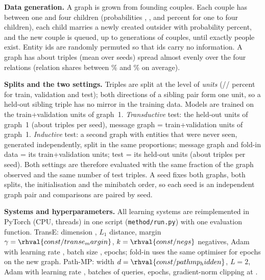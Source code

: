 \vspace{4pt}\noindent\textbf{Data generation.} A graph is grown from  founding couples. Each couple has between one and four children (probabilities , ,  and  percent for one to four children), each child marries a newly created outsider with probability  percent, and the new couple is queued, up to  generations of couples, until exactly  people exist. Entity ids are randomly permuted so that ids carry no information. A graph has about  triples (mean over seeds) spread almost evenly over the four relations (relation shares between \% and \% on average).

\vspace{4pt}\noindent\textbf{Splits and the two settings.} Triples are split at the level of \emph{units} (// percent for train, validation and test); both directions of a sibling pair form one unit, so a held-out sibling triple has no mirror in the training data. Models are trained on the train+validation units of graph~1. \emph{Transductive} test: the held-out units of graph~1 (about  triples per seed), message graph = train+validation units of graph~1. \emph{Inductive} test: a second graph with  entities that were never seen, generated independently, split in the same proportions; message graph and fold-in data = its train+validation units; test = its held-out units (about  triples per seed). Both settings are therefore evaluated with the same fraction of the graph observed and the same number of test triples. A seed fixes both graphs, both splits, the initialisation and the minibatch order, so each seed is an independent graph pair and comparisons are paired by seed.

\vspace{4pt}\noindent\textbf{Systems and hyperparameters.} All learning systems are reimplemented in PyTorch (CPU,  threads) in one script (\texttt{method/run.py}) with one evaluation function. TransE: dimension , $L_1$ distance, margin $\gamma=\rhval{const/transe_margin}$, $k=\rhval{const/negs}$ negatives, Adam with learning rate , batch size ,  epochs; fold-in uses the same optimiser for  epochs on the new graph. Path-MP: width $d=\rhval{const/pathmp_hidden}$, $L=2$, Adam with learning rate , batches of  queries,  epochs, gradient-norm clipping at .

